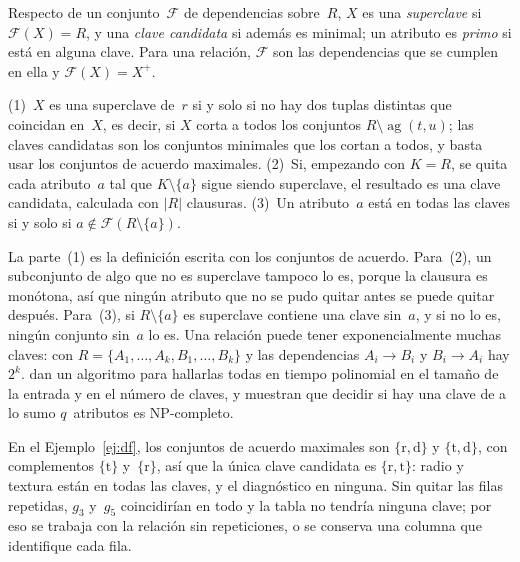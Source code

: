 \begin{definicion}\label{def:clave}
Respecto de un conjunto~$\mathcal{F}$ de dependencias sobre~$R$, $X$ es una \emph{superclave} si $\mathcal{F}(X) = R$, y una \emph{clave candidata} si además es minimal; un atributo es \emph{primo} si está en alguna clave. Para una relación, $\mathcal{F}$ son las dependencias que se cumplen en ella y $\mathcal{F}(X) = X^{+}$.
\end{definicion}

\begin{proposicion}\label{prop:claves}
(1)~$X$ es una superclave de~$r$ si y solo si no hay dos tuplas distintas que coincidan en~$X$, es decir, si $X$ corta a todos los conjuntos $R \setminus \operatorname{ag}(t, u)$; las claves candidatas son los conjuntos minimales que los cortan a todos, y basta usar los conjuntos de acuerdo maximales. (2)~Si, empezando con $K = R$, se quita cada atributo~$a$ tal que $K \setminus \{a\}$ sigue siendo superclave, el resultado es una clave candidata, calculada con $\lvert R \rvert$ clausuras. (3)~Un atributo~$a$ está en todas las claves si y solo si $a \notin \mathcal{F}(R \setminus \{a\})$.
\end{proposicion}

La parte~(1) es la definición escrita con los conjuntos de acuerdo. Para~(2), un subconjunto de algo que no es superclave tampoco lo es, porque la clausura es monótona, así que ningún atributo que no se pudo quitar antes se puede quitar después. Para~(3), si $R \setminus \{a\}$ es superclave contiene una clave sin~$a$, y si no lo es, ningún conjunto sin~$a$ lo es. Una relación puede tener exponencialmente muchas claves: con $R = \{A_1, \dots, A_k, B_1, \dots, B_k\}$ y las dependencias $A_i \to B_i$ y $B_i \to A_i$ hay $2^k$. \textcite{lucchesi1978} dan un algoritmo para hallarlas todas en tiempo polinomial en el tamaño de la entrada y en el número de claves, y muestran que decidir si hay una clave de a lo sumo $q$~atributos es NP-completo.

\begin{ejemplo}\label{ej:claves}
En el Ejemplo~\ref{ej:df}, los conjuntos de acuerdo maximales son $\{\mathrm{r}, \mathrm{d}\}$ y $\{\mathrm{t}, \mathrm{d}\}$, con complementos $\{\mathrm{t}\}$ y~$\{\mathrm{r}\}$, así que la única clave candidata es $\{\mathrm{r}, \mathrm{t}\}$: radio y textura están en todas las claves, y el diagnóstico en ninguna. Sin quitar las filas repetidas, $g_3$ y~$g_5$ coincidirían en todo y la tabla no tendría ninguna clave; por eso se trabaja con la relación sin repeticiones, o se conserva una columna que identifique cada fila.
\end{ejemplo}
